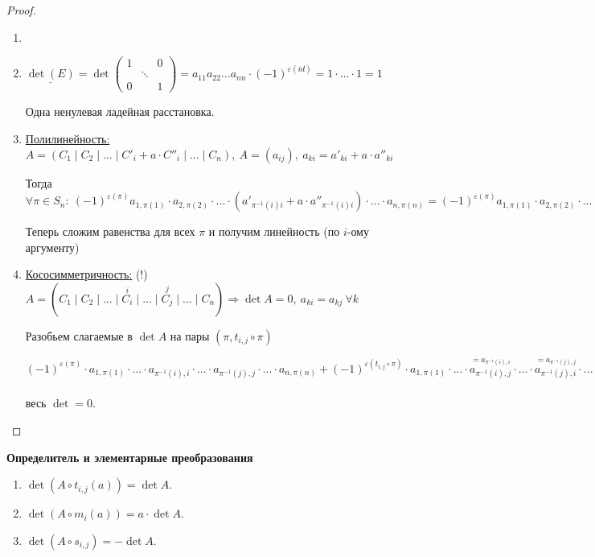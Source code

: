 \begin{proof}
    \begin{enumerate}
        \item[]
        \item $\underline{\det(E)}=\det\begin{pmatrix}
                                           1 & & 0 \\ & \ddots & \\ 0 & & 1
        \end{pmatrix}=a_{11}a_{22}...a_{nn}\cdot(-1)^{\varepsilon(id)}=1\cdot...\cdot 1=1$

        Одна ненулевая ладейная расстановка.
        \item \underline{Полилинейность:} $A=(C_1\mid C_2\mid ...\mid C'_i + a\cdot C''_i \mid ...\mid C_n),\ A=(a_{ij}),\ a_{ki}=a'_{ki}+a\cdot a''_{ki}$

        Тогда $\forall \pi\in S_n:\ (-1)^{\varepsilon(\pi)}a_{1,\pi(1)}\cdot a_{2,\pi(2)}\cdot ... \cdot (a'_{\pi^{-1}(i)i}+a\cdot a''_{\pi^{-1}(i)i})\cdot ...\cdot a_{n,\pi(n)}=(-1)^{\varepsilon(\pi)}a_{1,\pi(1)}\cdot a_{2,\pi(2)}\cdot ... \cdot a'_{\pi^{-1}(i)i}\cdot ...\cdot a_{n,\pi(n)}+a\cdot (-1)^{\varepsilon(\pi)}a_{1,\pi(1)}\cdot a_{2,\pi(2)}\cdot ... \cdot a''_{\pi^{-1}(i)i}\cdot ...\cdot a_{n,\pi(n)}$

        Теперь сложим равенства для всех $\pi$ и получим линейность (по $i$-ому аргументу)

        \item \underline{Кососимметричность:} (!) $A=(C_1\mid C_2\mid ...\mid \overset{i}{C_i} \mid ...\mid \overset{j}{C_j} \mid ...\mid C_n)\Rightarrow \det A=0,\ a_{ki}=a_{kj}\ \forall k$

        Разобьем слагаемые в $\det A$ на пары $(\pi, t_{i,j}\circ \pi)$

        $(-1)^{\varepsilon(\pi)}\cdot a_{1,\pi(1)}\cdot ...\cdot a_{\pi^{-1}(i), i}\cdot ...\cdot a_{\pi^{-1}(j), j}\cdot ...\cdot a_{n,\pi(n)} + (-1)^{\varepsilon(t_{i,j}\circ\pi)}\cdot a_{1,\pi(1)}\cdot ...\cdot \overset{=a_{\pi^{-1}(i), i}}{a_{\pi^{-1}(i), j}}\cdot ...\cdot \overset{=a_{\pi^{-1}(j), j}}{a_{\pi^{-1}(j), i}}\cdot ...\cdot a_{n,\pi(n)}=\prod\limits_{k=1}^na_{k,\pi(k)}\underbrace{((-1)^{\varepsilon(\pi)}+(-1)^{\varepsilon(t_{i,j}\circ\pi)})}_{=0\text{ по лемме}}\Rightarrow$ весь $\det=0$.
    \end{enumerate}
\end{proof}

\begin{theorem}
    \textbf{Определитель и элементарные преобразования}
    \begin{enumerate}
        \item $\det(A\circ t_{i,j}(a))=\det A$.
        \item $\det(A\circ m_{i}(a))=a\cdot \det A$.
        \item $\det(A\circ s_{i,j})=-\det A$.
    \end{enumerate}
\end{theorem}

